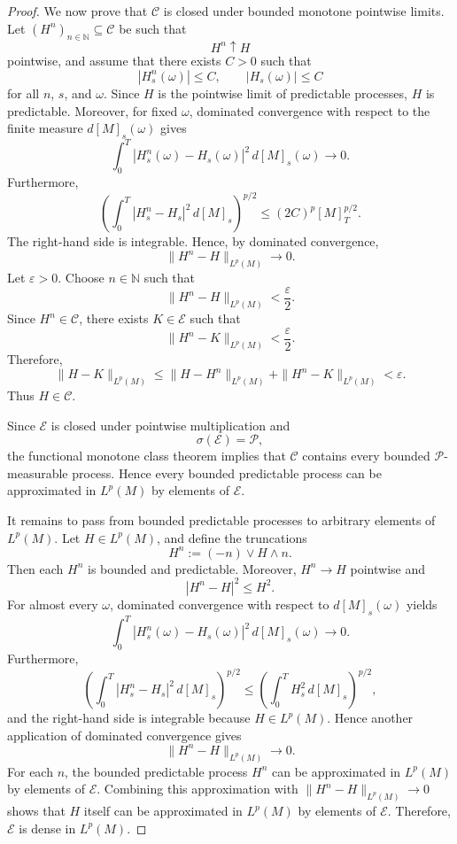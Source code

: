 \documentclass[11pt]{report}
\theoremstyle{plain} %
\theoremstyle{definition} %
\theoremstyle{remark} %
\begin{document}
\begin{proof}
We now prove that \(\mathcal C\) is closed under bounded monotone pointwise limits.
Let \((H^n)_{n\in\mathbb N}\subseteq \mathcal C\) be such that
\[
    H^n \uparrow H
\]
pointwise, and assume that there exists \(C>0\) such that
\[
    |H^n_s(\omega)| \leq C,
    \qquad
    |H_s(\omega)| \leq C
\]
for all \(n\), \(s\), and \(\omega\). Since \(H\) is the pointwise limit of predictable
processes, \(H\) is predictable. Moreover, for fixed \(\omega\), dominated convergence with
respect to the finite measure \(d[M]_s(\omega)\) gives
\[
    \int_0^T |H^n_s(\omega)-H_s(\omega)|^2\,d[M]_s(\omega)
    \longrightarrow 0 .
\]
Furthermore,
\[
    \left(
        \int_0^T |H^n_s-H_s|^2\,d[M]_s
    \right)^{p/2}
    \leq
    (2C)^p [M]_T^{p/2}.
\]
The right-hand side is integrable. Hence, by dominated convergence,
\[
    \|H^n-H\|_{L^p(M)}\to 0 .
\]
Let \(\varepsilon>0\). Choose \(n\in\mathbb N\) such that
\[
    \|H^n-H\|_{L^p(M)}<\frac{\varepsilon}{2}.
\]
Since \(H^n\in\mathcal C\), there exists \(K\in\mathcal E\) such that
\[
    \|H^n-K\|_{L^p(M)}<\frac{\varepsilon}{2}.
\]
Therefore,
\[
    \|H-K\|_{L^p(M)}
    \leq
    \|H-H^n\|_{L^p(M)}
    +
    \|H^n-K\|_{L^p(M)}
    <\varepsilon .
\]
Thus \(H\in\mathcal C\).

Since \(\mathcal E\) is closed under pointwise multiplication and
\[
    \sigma(\mathcal E)=\mathcal P,
\]
the functional monotone class theorem implies that \(\mathcal C\) contains every bounded
\(\mathcal P\)-measurable process. Hence every bounded predictable process can be
approximated in \(L^p(M)\) by elements of \(\mathcal E\).

It remains to pass from bounded predictable processes to arbitrary elements of
\(L^p(M)\). Let \(H\in L^p(M)\), and define the truncations
\[
    H^n := (-n)\vee H \wedge n .
\]
Then each \(H^n\) is bounded and predictable. Moreover, \(H^n\to H\) pointwise and
\[
    |H^n-H|^2 \leq H^2 .
\]
For almost every \(\omega\), dominated convergence with respect to \(d[M]_s(\omega)\)
yields
\[
    \int_0^T |H^n_s(\omega)-H_s(\omega)|^2\,d[M]_s(\omega)
    \longrightarrow 0 .
\]
Furthermore,
\[
    \left(
        \int_0^T |H^n_s-H_s|^2\,d[M]_s
    \right)^{p/2}
    \leq
    \left(
        \int_0^T H_s^2\,d[M]_s
    \right)^{p/2},
\]
and the right-hand side is integrable because \(H\in L^p(M)\). Hence another application
of dominated convergence gives
\[
    \|H^n-H\|_{L^p(M)}\to 0 .
\]
For each \(n\), the bounded predictable process \(H^n\) can be approximated in
\(L^p(M)\) by elements of \(\mathcal E\). Combining this approximation with
\(\|H^n-H\|_{L^p(M)}\to 0\) shows that \(H\) itself can be approximated in \(L^p(M)\) by
elements of \(\mathcal E\). Therefore, \(\mathcal E\) is dense in \(L^p(M)\).
\end{proof}
\end{document}

